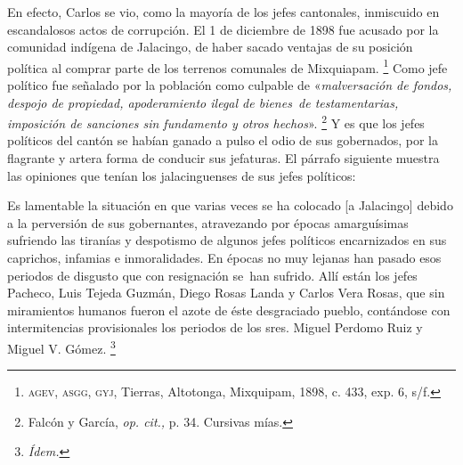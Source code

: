 \documentclass[14pt,twoside,final]{extbook} %
\let\oldfootnote\footnote
\renewcommand\footnote[1]{%
\oldfootnote{\hspace{1mm}#1}}
\begin{document}
En efecto, Carlos se vio, como la mayoría de los jefes cantonales, inmiscuido en escandalosos actos de corrupción. El 1 de diciembre de 1898 fue acusado por la comunidad indígena de Jalacingo, de haber sacado ventajas de su posición política al comprar parte de los terrenos comunales de Mixquiapam.\footnote{\textsc{agev, asgg, gyj}, Tierras, Altotonga, Mixquipam, 1898, c. 433, exp. 6, s/f.} Como jefe político fue señalado por la población como culpable de «\emph{malversación de fondos, despojo de propiedad, apoderamiento ilegal de bienes~de testamentarias, imposición de sanciones sin fundamento y otros hechos}».\footnote{Falcón y García, \emph{op. cit.,} p. 34. Cursivas mías.} Y es que los jefes políticos del cantón se habían ganado a pulso el odio de sus gobernados, por la flagrante y artera forma de conducir sus jefaturas. El párrafo siguiente muestra las opiniones que tenían los jalacinguenses de sus jefes políticos:
\begin{quoting}
Es lamentable la situación en que varias veces se ha colocado [a Jalacingo] debido a la perversión de sus gobernantes, atravezando por épocas amarguísimas sufriendo las tiranías y despotismo de algunos jefes políticos encarnizados en sus caprichos, infamias e inmoralidades. En épocas no muy lejanas han pasado esos periodos de disgusto que con resignación se~han sufrido. Allí están los jefes Pacheco, Luis Tejeda Guzmán, Diego Rosas Landa y Carlos Vera Rosas, que sin miramientos humanos fueron el azote de éste desgraciado pueblo, contándose con intermitencias provisionales los periodos de los sres. Miguel Perdomo Ruiz y Miguel V. Gómez.\footnote{\em Ídem.}
\end{quoting}
\end{document}
